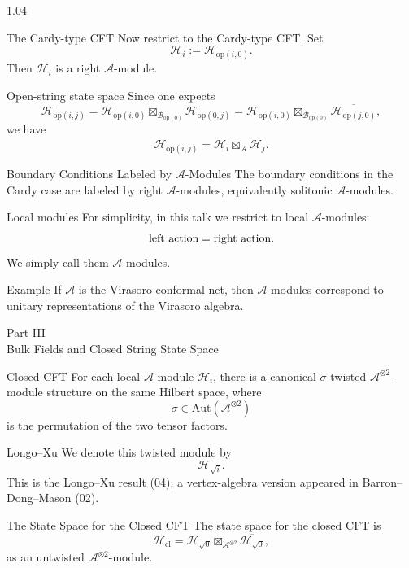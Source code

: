 \documentclass[xcolor={dvipsnames}]{beamer}
\theoremstyle{definition}
\theoremstyle{plain}
\newcommand{\MA}{\mathcal{A}}
\newcommand{\MB}{\mathcal{B}}
\newcommand{\MH}{\mathcal{H}}
\newcommand{\cl}{\mathrm{cl}}
\newcommand{\op}{\mathrm{op}}
\newcommand{\Aut}{\mathrm{Aut}}
\newcommand{\Hcl}{\MH_{\cl}}
\newcommand{\Hopij}[2]{\MH_{\op(#1,#2)}}
\newcommand{\Bopi}[1]{\MB_{\op(#1)}}
\newcommand{\Hsqrt}[1]{\MH_{\sqrt{#1}}}
\newcommand{\bA}{\boxtimes_{\MA}}
\newcommand{\bAtwo}{\boxtimes_{\MA^{\otimes 2}}}
\newcommand{\PartFrame}[2]{%
\begin{frame}
\vfill
\begin{center}
{\large\textcolor{myteal!70!black}{Part #1}}\\[.35cm]
{\LARGE\textcolor{deepblue}{#2}}
\end{center}
\vfill
\end{frame}}
\begin{document}
\begin{spacing}{1.04}
\begin{frame}[t]{The Cardy-type CFT}
\small
Now restrict to the Cardy-type CFT.  Set
\[
  \MH_i:=\Hopij{i}{0}.
\]
Then $\MH_i$ is a right $\MA$-module. %

\begin{block}{Open-string state space}
Since one expects
\[
  \Hopij{i}{j}
  =
  \Hopij{i}{0}\boxtimes_{\Bopi{0}}\Hopij{0}{j}
  =
  \Hopij{i}{0}\boxtimes_{\Bopi{0}}\overline{\Hopij{j}{0}},
\]
we have
\[
  \Hopij{i}{j}
  =
  \MH_i\bA\overline{\MH_j}.
\]
\end{block}
\end{frame}

\begin{frame}[t]{Boundary Conditions Labeled by $\MA$-Modules}
\small
The boundary conditions in the Cardy case are labeled by right $\MA$-modules, equivalently solitonic $\MA$-modules.

\begin{block}{Local modules}
For simplicity, in this talk we restrict to local $\MA$-modules:
\[
  \hbox{left action}=\hbox{right action}.
\]
We simply call them $\MA$-modules.
\end{block}

\begin{block}{Example}
If $\MA$ is the Virasoro conformal net, then $\MA$-modules correspond to unitary representations of the Virasoro algebra.
\end{block}
\end{frame}

\PartFrame{III}{Bulk Fields and Closed String State Space}

\begin{frame}[t]{Closed CFT}
\footnotesize
For each local $\MA$-module $\MH_i$, there is a canonical $\sigma$-twisted $\MA^{\otimes 2}$-module structure on the same Hilbert space, where
\[
  \sigma\in\Aut(\MA^{\otimes 2})
\]
is the permutation of the two tensor factors.

\begin{block}{Longo--Xu}
We denote this twisted module by
\[
  \Hsqrt{i}.
\]
This is the Longo--Xu result (04); a vertex-algebra version appeared in Barron--Dong--Mason (02).
\end{block}
\end{frame}

\begin{frame}[t]{The State Space for the Closed CFT}
\footnotesize
The state space for the closed CFT is
\[
  \Hcl
  =
  \Hsqrt{0}\bAtwo\overline{\Hsqrt{0}},
\]
as an untwisted $\MA^{\otimes 2}$-module.


\end{frame}
\end{spacing}
\end{document}
